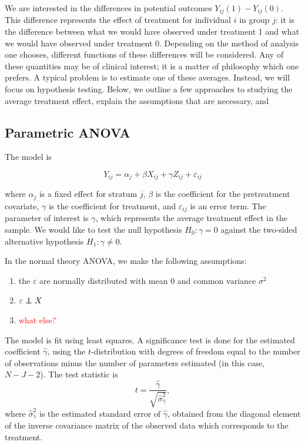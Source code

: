 \documentclass[11pt]{article}
\newcommand{\todo}[1]{{\color{red}{TO DO: \sc #1}}}
\newcommand{\eps}{\varepsilon}
\newcommand\independent{\protect\mathpalette{\protect\independenT}{\perp}}
\def\independenT#1#2{\mathrel{\rlap{$#1#2$}\mkern2mu{#1#2}}}
\begin{document}
We are interested in the differences in potential outcomes $Y_{ij}(1) - Y_{ij}(0)$.
This difference represents the effect of treatment for individual $i$ in group $j$: it is the difference between what we would have observed under treatment 1 and what we would have observed under treatment $0$.
Depending on the method of analysis one chooses, different functions of these differences will be considered.
Any of these quantities may be of clinical interest; it is a matter of philosophy which one prefers.
A typical problem is to estimate one of these averages.
Instead, we will focus on hypothesis testing.
Below, we outline a few approaches to studying the average treatment effect, explain the assumptions that are necessary, and 

\subsection{Parametric ANOVA}

The model is

$$Y_{ij} = \alpha_j + \beta X_{ij} + \gamma Z_{ij} + \eps_{ij}$$

where $\alpha_j$ is a fixed effect for stratum $j$, $\beta$ is the coefficient for the pretreatment covariate,
$\gamma$ is the coefficient for treatment,
and $\eps_{ij}$ is an error term.
The parameter of interest is $\gamma$, which represents the average treatment effect in the sample. 
We would like to test the null hypothesis $H_0: \gamma = 0$ against
the two-sided alternative hypothesis $H_1: \gamma \neq 0$.

In the normal theory ANOVA, we make the following assumptions:
\begin{enumerate}
\item the $\eps$ are normally distributed with mean $0$ and common variance $\sigma^2$
\item $\eps \independent X$
\item \textcolor{red}{ what else? }
\end{enumerate}

The model is fit using least squares.
A significance test is done for the estimated coefficient $\hat{\gamma}$, using the $t$-distribution with degrees of freedom equal to the number of observations minus the number of parameters estimated (in this case, $N - J - 2$).
The test statistic is
$$ t = \frac{\hat{\gamma}}{\sqrt{ \hat{\sigma}_{\hat{\gamma}}^2}},$$
where $\hat{\sigma}_{\hat{\gamma}}^2$ is the estimated standard error of $\hat{\gamma}$, obtained from the diagonal element of the inverse covariance matrix of the observed data which corresponds to the treatment.
\todo{cite freedman linear models textbook}
\end{document}
